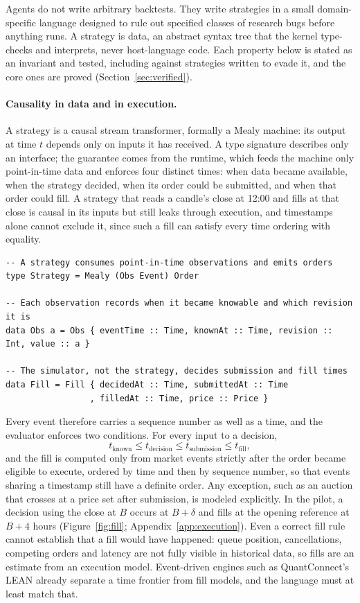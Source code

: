 \documentclass[11pt]{article}
\begin{document}
Agents do not write arbitrary backtests. They write strategies in a small domain-specific language designed to rule out specified classes of research bugs before anything runs. A strategy is data, an abstract syntax tree that the kernel type-checks and interprets, never host-language code. Each property below is stated as an invariant and tested, including against strategies written to evade it, and the core ones are proved (Section~\ref{sec:verified}).

\paragraph{Causality in data and in execution.} A strategy is a causal stream transformer, formally a Mealy machine: its output at time $t$ depends only on inputs it has received. A type signature describes only an interface; the guarantee comes from the runtime, which feeds the machine only point-in-time data and enforces four distinct times: when data became available, when the strategy decided, when its order could be submitted, and when that order could fill. A strategy that reads a candle's close at 12:00 and fills at that close is causal in its inputs but still leaks through execution, and timestamps alone cannot exclude it, since such a fill can satisfy every time ordering with equality.

\begin{lstlisting}
-- A strategy consumes point-in-time observations and emits orders
type Strategy = Mealy (Obs Event) Order

-- Each observation records when it became knowable and which revision it is
data Obs a = Obs { eventTime :: Time, knownAt :: Time, revision :: Int, value :: a }

-- The simulator, not the strategy, decides submission and fill times
data Fill = Fill { decidedAt :: Time, submittedAt :: Time
                 , filledAt :: Time, price :: Price }
\end{lstlisting}

Every event therefore carries a sequence number as well as a time, and the evaluator enforces two conditions. For every input to a decision,
\begin{equation}
  t_{\mathrm{known}} \le t_{\mathrm{decision}} \le t_{\mathrm{submission}} \le t_{\mathrm{fill}},
\end{equation}
and the fill is computed only from market events strictly after the order became eligible to execute, ordered by time and then by sequence number, so that events sharing a timestamp still have a definite order. Any exception, such as an auction that crosses at a price set after submission, is modeled explicitly. In the pilot, a decision using the close at $B$ occurs at $B+\delta$ and fills at the opening reference at $B+4$ hours (Figure~\ref{fig:fill}; Appendix~\ref{app:execution}). Even a correct fill rule cannot establish that a fill would have happened: queue position, cancellations, competing orders and latency are not fully visible in historical data, so fills are an estimate from an execution model. Event-driven engines such as QuantConnect's LEAN \cite{lean} already separate a time frontier from fill models, and the language must at least match that.
\end{document}
